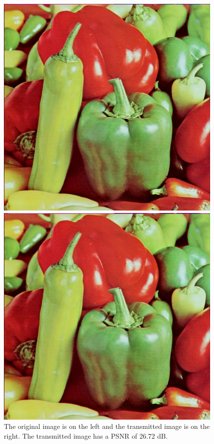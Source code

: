 \documentclass{article}
\begin{document}
\begin{figure}[H]
	\centering
	\begin{minipage}{0.48\textwidth}
		\includegraphics[scale=0.3]{Peppers.jpg}
	\end{minipage}
	\begin{minipage}{0.48\textwidth}
		\includegraphics[scale=0.3]{Peppers_new_SNR_3.jpg}
	\end{minipage}
	\caption{The original image is on the left and the transmitted image is on the right. The transmitted image has a PSNR of 26.72 dB.}
\end{figure}
\end{document}
